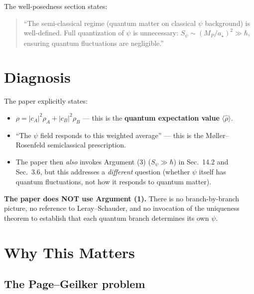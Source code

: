 \documentclass[11pt,a4paper]{article}
\begin{document}
The well-posedness section states:
\begin{quote}
``The semi-classical regime (quantum matter on classical $\psi$ background)
is well-defined. Full quantization of $\psi$ is unnecessary:
$S_\psi \sim (M_P/a_\star)^2 \gg \hbar$, ensuring quantum fluctuations
are negligible.''
\end{quote}

\section{Diagnosis}

\begin{tcolorbox}[colback=yellow!10!white, colframe=orange!80!black,
  title=\textbf{FINDING: The paper uses Argument (2), which is problematic}]

The paper explicitly states:
\begin{itemize}
\item $\rho = |c_A|^2\rho_A + |c_B|^2\rho_B$ --- this is the
\textbf{quantum expectation value} $\langle\hat\rho\rangle$.
\item ``The $\psi$ field responds to this weighted average'' ---
this is the M{\o}ller--Rosenfeld semiclassical prescription.
\item The paper then \emph{also} invokes Argument (3)
($S_\psi \gg \hbar$) in Sec.~14.2 and Sec.~3.6, but this addresses
a \emph{different} question (whether $\psi$ itself has quantum
fluctuations, not how it responds to quantum matter).
\end{itemize}

\textbf{The paper does NOT use Argument (1).} There is no
branch-by-branch picture, no reference to Leray--Schauder, and no
invocation of the uniqueness theorem to establish that each quantum
branch determines its own $\psi$.
\end{tcolorbox}

\section{Why This Matters}

\subsection{The Page--Geilker problem}
\end{document}
